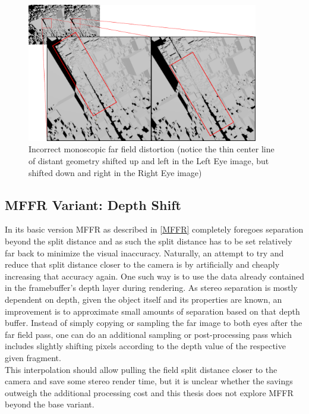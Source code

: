 \begin{figure}[H]
  \centering
  \includegraphics[width=0.9\textwidth]{pictures/mffr_tilt_distortion}
  \caption{Incorrect monoscopic far field distortion (notice the thin center line of distant geometry shifted up and left in the Left Eye image, but shifted down and right in the Right Eye image)} \label{fig:distortion_MFFR}
\end{figure}

\subsection{\gls{MFFR} Variant: Depth Shift}  \label{MFFR_depthshift}
In its basic version \gls{MFFR} as described in \autoref{MFFR} completely foregoes separation beyond the split distance and as such the split distance has to be set relatively far back to minimize the visual inaccuracy. Naturally, an attempt to try and reduce that split distance closer to the camera is by artificially and cheaply increasing that accuracy again. One such way is to use the data already contained in the framebuffer's depth layer during rendering. As stereo separation is mostly dependent on depth, given the object itself and its properties are known, an improvement is to approximate small amounts of separation based on that depth buffer. Instead of simply copying or sampling the far image to both eyes after the far field pass, one can do an additional sampling or post-processing pass which includes slightly shifting pixels according to the depth value of the respective given fragment. \\
This interpolation should allow pulling the field split distance closer to the camera and save some stereo render time, but it is unclear whether the savings outweigh the additional processing cost and this thesis does not explore \gls{MFFR} beyond the base variant. 

